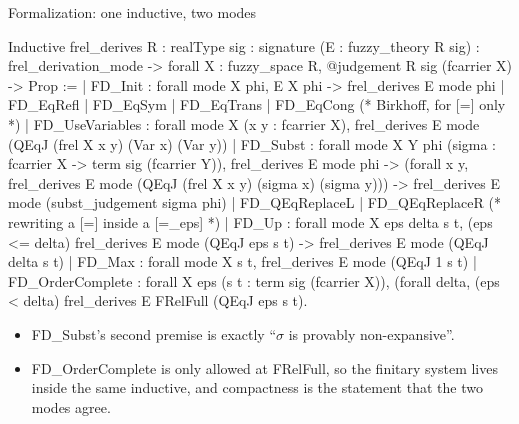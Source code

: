 \documentclass[10pt,aspectratio=169]{beamer}
\makeatletter
\newcommand{\ptag}[1]{\hfill\textit{#1}}
\newcommand{\soundnessscript}{%
    \pline{0}{Theorem derives\_fin\_sound (A : FuzzyAlgebra R sig)}
    \pline{0}{\ \ \ \ (E : fuzzy\_theory R sig) (X : fuzzy\_space R)}
    \pline{0}{\ \ \ \ (phi : @judgement R sig (fcarrier X)) :}
    \pline{0}{\ \ fuzzy\_models A E -> derives\_fin E phi ->}
    \pline{0}{\ \ satisfies A X phi.}
    \pline{0}{Proof.}
    \pline{1}{\ \ rewrite /fuzzy\_models /satisfies /derives\_fin.}
    \pline{1}{\ \ move => Hmodel Hderive rho.}
    \pline{2}{\ \ remember FRelFinite as mode eqn:Hmode in Hderive.}
    \pline{2}{\ \ revert Hmode.}
    \pline{3}{\ \ induction Hderive; intros Hmode.}
    \pline{4}{\ \ - apply: Hmodel X phi H rho.\ptag{Init}}
    \pline{4}{\ \ - by [].\ptag{EqRefl}}
    \pline{4}{\ \ - symmetry. exact: IHHderive ...\ptag{EqSym}}
    \pline{4}{\ \ - by rewrite (IHHderive1 ...) ...\ptag{EqTrans}}
    \pline{4}{\ \ - congr fa\_ops; apply ...\ptag{EqCong}}
    \pline{5}{\ \ - move => //=.\ptag{UseVars}}
    \pline{5}{\ \ \ \ apply: (interpretation\_nexp rho).}
    \pline{6}{\ \ - apply: satisfies\_subst. ...\ptag{Subst}}
    \pline{6}{\ \ - rewrite (IHHderive1 ...). ...\ptag{QEqRepL}}
    \pline{6}{\ \ - rewrite -(IHHderive2 ...). ...\ptag{QEqRepR}}
    \pline{6}{\ \ - apply: le\_trans ... H.\ptag{Up}}
    \pline{6}{\ \ - apply: (andP (frel\_range ...)).2\ptag{Max}}
    \pline{6}{\ \ - discriminate Hmode.\ptag{OrderCompl}}
    \pline{6}{Qed.}
}
\newcommand{\rid}[1]{{\ttfamily\small #1}}
\makeatother
\begin{document}
            \begin{frame}[fragile]{Formalization: one inductive, two modes}
                \begin{srcbox}
Inductive frel_derives {R : realType} {sig : signature}
    (E : fuzzy_theory R sig) : frel_derivation_mode ->
    forall X : fuzzy_space R, @judgement R sig (fcarrier X) -> Prop :=
  | FD_Init : forall mode X phi, E X phi -> frel_derives E mode phi
  | FD_EqRefl | FD_EqSym | FD_EqTrans | FD_EqCong  (* Birkhoff, for [=] only *)
  | FD_UseVariables : forall mode X (x y : fcarrier X),
      frel_derives E mode (QEqJ (frel X x y) (Var x) (Var y))
  | FD_Subst : forall mode X Y phi (sigma : fcarrier X -> term sig (fcarrier Y)),
      frel_derives E mode phi ->
      (forall x y, frel_derives E mode (QEqJ (frel X x y) (sigma x) (sigma y))) ->
      frel_derives E mode (subst_judgement sigma phi)
  | FD_QEqReplaceL | FD_QEqReplaceR   (* rewriting a [=] inside a [=_eps] *)
  | FD_Up : forall mode X eps delta s t, (eps <= delta)%
      frel_derives E mode (QEqJ eps s t) -> frel_derives E mode (QEqJ delta s t)
  | FD_Max : forall mode X s t, frel_derives E mode (QEqJ 1 s t)
  | FD_OrderComplete : forall X eps (s t : term sig (fcarrier X)),
      (forall delta, (eps < delta)%
      frel_derives E FRelFull (QEqJ eps s t).
                \end{srcbox}
                    \begin{itemize}\small
                        \item \rid{FD\_Subst}'s second premise is
                            exactly ``$\sigma$ is
                            provably non-expansive''.
                        \item \rid{FD\_OrderComplete} is only allowed at
                            \rid{FRelFull}, so the
                            finitary system lives inside the same
                            inductive, and compactness
                            is the statement that the two modes agree.
                    \end{itemize}
                \end{frame}

                \newcommand{\sndpane}[1]{%
                    \begin{scriptbox}[fontupper=\ttfamily\fontsize{5.8pt}{6.6pt}\selectfont\frenchspacing]%
                        \pstep{#1}\soundnessscript
                \end{scriptbox}}
\end{document}
